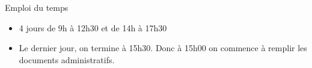 \begin{frame}{Emploi du temps}
  \begin{itemize}
  \item 4 jours de 9h à 12h30 et de 14h à 17h30
  \item Le dernier jour, on termine à 15h30.
    Donc à 15h00 on commence à remplir les documents administratifs.
  \end{itemize}
\end{frame}
